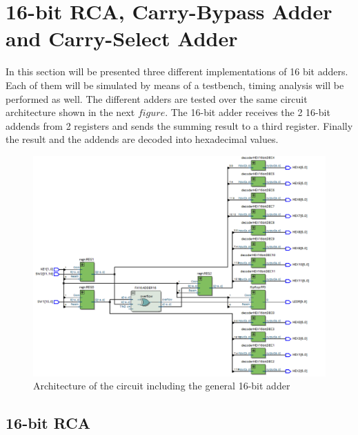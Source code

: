 \documentclass[12pt]{article}
\begin{document}
\newpage
\section{ 16-bit RCA, Carry-Bypass Adder and Carry-Select Adder }

In this section will be presented three different implementations of 16 bit adders. 
Each of them will be simulated by means of a testbench, timing analysis will be performed as well. 
The different adders are tested over the same circuit architecture shown in the next $figure$. The 16-bit adder receives the 2 16-bit addends from 2 registers and sends the summing result to a third register. Finally the result and the addends are decoded into hexadecimal values.
\newline
\newline

\begin{figure}[h]
	\centering
	\includegraphics[scale = 0.6]{immagini/niki/rtlgeneral.png}
	\caption{Architecture of the circuit including the general 16-bit adder}       
	
\end{figure}
\newpage
\subsection{16-bit RCA}
\end{document}
